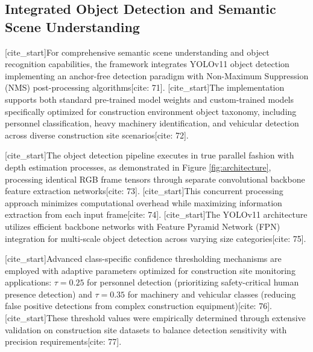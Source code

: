 \subsection{Integrated Object Detection and Semantic Scene Understanding}
[cite_start]For comprehensive semantic scene understanding and object recognition capabilities, the framework integrates YOLOv11 object detection implementing an anchor-free detection paradigm with Non-Maximum Suppression (NMS) post-processing algorithms[cite: 71]. [cite_start]The implementation supports both standard pre-trained model weights and custom-trained models specifically optimized for construction environment object taxonomy, including personnel classification, heavy machinery identification, and vehicular detection across diverse construction site scenarios[cite: 72].

[cite_start]The object detection pipeline executes in true parallel fashion with depth estimation processes, as demonstrated in Figure \ref{fig:architecture}, processing identical RGB frame tensors through separate convolutional backbone feature extraction networks[cite: 73]. [cite_start]This concurrent processing approach minimizes computational overhead while maximizing information extraction from each input frame[cite: 74]. [cite_start]The YOLOv11 architecture utilizes efficient backbone networks with Feature Pyramid Network (FPN) integration for multi-scale object detection across varying size categories[cite: 75].

[cite_start]Advanced class-specific confidence thresholding mechanisms are employed with adaptive parameters optimized for construction site monitoring applications: $\tau=0.25$ for personnel detection (prioritizing safety-critical human presence detection) and $\tau=0.35$ for machinery and vehicular classes (reducing false positive detections from complex construction equipment)[cite: 76]. [cite_start]These threshold values were empirically determined through extensive validation on construction site datasets to balance detection sensitivity with precision requirements[cite: 77].

